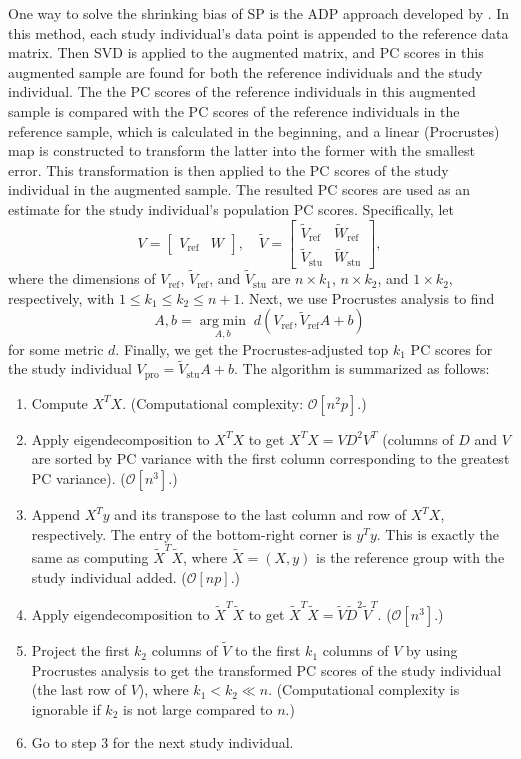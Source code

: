 \documentclass{article}
\newcommand{\bO}{\mathcal{O}}
\newcommand{\argmin}[1]{\underset{#1}{\operatorname{arg\;min}}\;}
\begin{document}
One way to solve the shrinking bias of SP is the ADP approach developed by \cite{wang}.
In this method, each study individual's data point is appended to the reference
data matrix.
Then SVD is applied to the augmented matrix,
and PC scores in this augmented sample are found for both the reference
individuals and the study individual.
The the PC scores of the reference individuals in this augmented sample is
compared with the PC scores of the reference individuals in the reference
sample,
which is calculated in the beginning,
and a linear (Procrustes) map is constructed to transform the latter into the former
with the smallest error.
This transformation is then applied to the PC scores of the study individual in
the augmented sample.
The resulted PC scores are used as an estimate for the study individual's
population PC scores.
Specifically, let
\[
  V =
  \begin{bmatrix}
    V_{\text{ref}} & W
  \end{bmatrix},
  \quad
  \tilde{V} =
  \begin{bmatrix}
    \tilde{V}_{\text{ref}} & \tilde{W}_\text{ref} \\
    \tilde{V}_\text{stu} & \tilde{W}_\text{stu}
  \end{bmatrix},
\]
where the dimensions of $V_\text{ref}$, $\tilde{V}_\text{ref}$, and $\tilde{V}_\text{stu}$ are $n \times k_1$, $n \times k_2$, and $1 \times k_2$, respectively, with $ 1 \leq k_1 \leq k_2 \leq n+1$. 
Next, we use Procrustes analysis to find
\[
  A, b = \argmin{A, b} d(V_\text{ref}, \tilde{V}_{\text{ref}}A+b)
\]
for some metric $d$.
Finally, we get the Procrustes-adjusted top $k_1$ PC scores for the study individual $V_\text{pro} = \tilde{V}_\text{stu} A + b$.
The algorithm is summarized as follows:
\begin{enumerate}
\item Compute $X^T X$.
  (Computational complexity: $\bO[n^2p]$.)  
\item Apply eigendecomposition to $X^T X$ to get $X^T X = V D^2 V^T$ (columns of $D$ and $V$ are sorted by PC variance with the first column corresponding to the greatest PC variance).
  ($\bO[n^3]$.)
\item Append $X^T y$ and its transpose to the last column and row of $X^T X$, respectively.
  The entry of the bottom-right corner is $y^T y$.
  This is exactly the same as computing $\tilde{X}^T \tilde{X}$,
  where $\tilde{X} = (X, y)$ is the reference group with the study individual added.
  ($\bO[np]$.)
\item Apply eigendecomposition to $\tilde{X}^T \tilde{X}$ to get $\tilde{X}^T \tilde{X} = \tilde{V} \tilde{D}^2 \tilde{V}^T$.
  ($\bO[n^3]$.)
\item Project the first $k_2$ columns of $\tilde{V}$ to the first $k_1$ columns of $V$ by using Procrustes analysis to get the transformed PC scores of the study individual (the last row of $V$),
  where $k_1 < k_2 \ll n$.
  (Computational complexity is ignorable if $k_2$ is not large compared to $n$.)
  \item Go to step 3 for the next study individual.
\end{enumerate}
\end{document}
